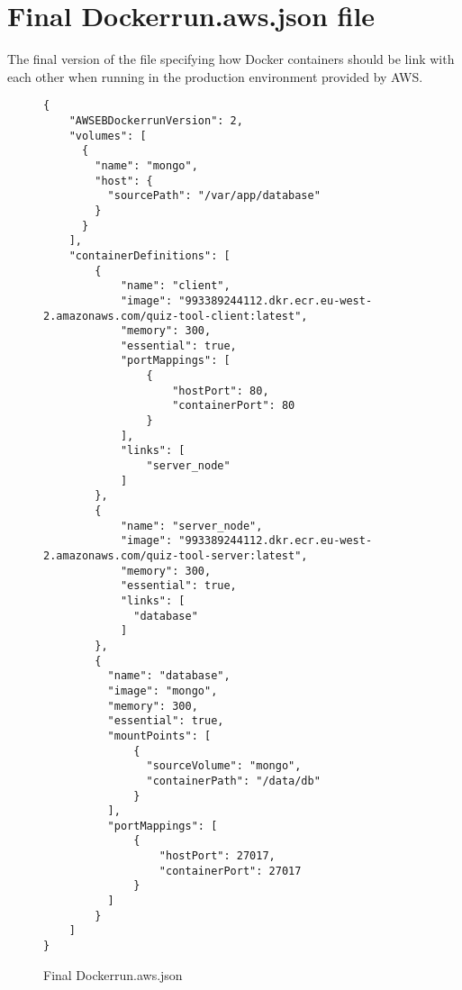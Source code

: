 \section{Final Dockerrun.aws.json file}
The final version of the file specifying how Docker containers should be link with each other
when running in the production environment provided by AWS.
\begin{figure}[h!]
  \begin{lstlisting}[basicstyle=\tiny, breaklines=true]
{
    "AWSEBDockerrunVersion": 2,
    "volumes": [
      {
        "name": "mongo",
        "host": {
          "sourcePath": "/var/app/database"
        }
      }
    ],
    "containerDefinitions": [
        {
            "name": "client",
            "image": "993389244112.dkr.ecr.eu-west-2.amazonaws.com/quiz-tool-client:latest",
            "memory": 300,
            "essential": true,
            "portMappings": [
                {
                    "hostPort": 80,
                    "containerPort": 80
                }
            ],
            "links": [
                "server_node"
            ]
        },
        {
            "name": "server_node",
            "image": "993389244112.dkr.ecr.eu-west-2.amazonaws.com/quiz-tool-server:latest",
            "memory": 300,
            "essential": true,
            "links": [
              "database"
            ]
        },
        {
          "name": "database",
          "image": "mongo",
          "memory": 300,
          "essential": true,
          "mountPoints": [
              {
                "sourceVolume": "mongo",
                "containerPath": "/data/db"
              }
          ],
          "portMappings": [
              {
                  "hostPort": 27017,
                  "containerPort": 27017
              }
          ]
        }
    ]
}
\end{lstlisting}
\caption{Final Dockerrun.aws.json}
\label{sample:dockerrunawsfinal}
\end{figure}
